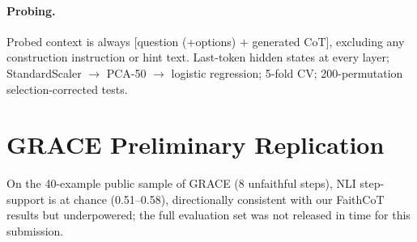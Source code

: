 \documentclass[11pt]{article}
\begin{document}
\paragraph{Probing.} Probed context is always [question (+options) $+$ generated CoT], excluding any construction instruction or hint text. Last-token hidden states at every layer; StandardScaler $\to$ PCA-50 $\to$ logistic regression; 5-fold CV; 200-permutation selection-corrected tests.

\section{GRACE Preliminary Replication}
On the 40-example public sample of GRACE \citep{pham2026grace} (8 unfaithful steps), NLI step-support is at chance (0.51--0.58), directionally consistent with our FaithCoT results but underpowered; the full evaluation set was not released in time for this submission.
\end{document}
